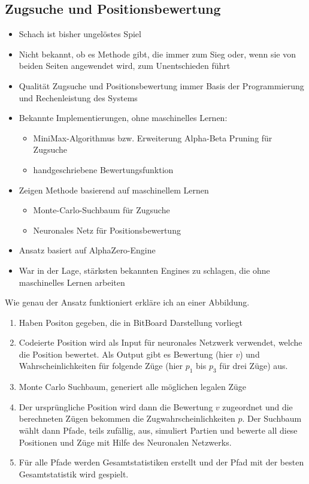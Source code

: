 \newpage

\subsection{Zugsuche und Positionsbewertung}

\begin{itemize}[leftmargin=*]
\item Schach ist bisher ungelöstes Spiel
\item Nicht bekannt, ob es Methode gibt, die immer zum Sieg oder, wenn sie von beiden Seiten angewendet wird, zum Unentschieden führt
\item Qualität Zugsuche und Positionsbewertung immer Basis der Programmierung und Rechenleistung des Systems
\item Bekannte Implementierungen, ohne maschinelles Lernen:
\begin{itemize}[leftmargin=*]
\item MiniMax-Algorithmus bzw. Erweiterung Alpha-Beta Pruning für Zugsuche
\item handgeschriebene Bewertungsfunktion
\end{itemize}
\item Zeigen Methode basierend auf maschinellem Lernen
\begin{itemize}[leftmargin=*]
\item Monte-Carlo-Suchbaum für Zugsuche
\item Neuronales Netz für Positionsbewertung
\end{itemize}
\item Ansatz basiert auf AlphaZero-Engine
\item War in der Lage, stärksten bekannten Engines zu schlagen, die ohne maschinelles Lernen arbeiten
\end{itemize}

\newpage

Wie genau der Ansatz funktioniert erkläre ich an einer Abbildung.

\begin{enumerate}[leftmargin=*]
\item Haben Positon gegeben, die in BitBoard Darstellung vorliegt
\item Codeierte Position wird als Input für neuronales Netzwerk verwendet, welche die Position bewertet. Als Output gibt es Bewertung (hier $v$) und Wahrscheinlichkeiten für folgende Züge (hier $p_1$ bis $p_3$ für drei Züge) aus.
\item Monte Carlo Suchbaum, generiert alle möglichen legalen Züge
\item Der ursprüngliche Position wird dann die Bewertung $v$ zugeordnet und die berechneten Zügen bekommen die Zugwahrscheinlichkeiten $p$. Der Suchbaum wählt dann Pfade, teils zufällig, aus, simuliert Partien und bewerte all diese Positionen und Züge mit Hilfe des Neuronalen Netzwerks.
\item Für alle Pfade werden Gesamtstatistiken erstellt und der Pfad mit der besten Gesamtstatistik wird gespielt.
\end{enumerate}

